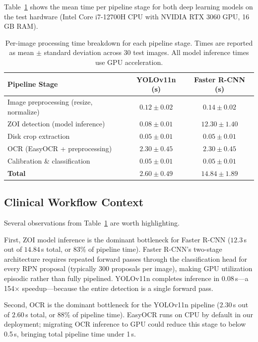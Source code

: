 Table~\ref{tab:processing_time} shows the mean time per pipeline stage
for both deep learning models on the test hardware
(Intel Core i7-12700H CPU with NVIDIA RTX 3060 GPU, 16\,GB RAM).

\begin{table}[H]
  \centering
  \caption{Per-image processing time breakdown for each pipeline stage.
           Times are reported as mean $\pm$ standard deviation across 30 test images.
           All model inference times use GPU acceleration.}
  \label{tab:processing_time}
  \begin{tabular}{lcc}
    \toprule
    \textbf{Pipeline Stage} &
    \textbf{YOLOv11n (s)} &
    \textbf{Faster R-CNN (s)} \\
    \midrule
    Image preprocessing (resize, normalize) & $0.12 \pm 0.02$ & $0.14 \pm 0.02$ \\
    ZOI detection (model inference)          & $0.08 \pm 0.01$ & $12.30 \pm 1.40$ \\
    Disk crop extraction                     & $0.05 \pm 0.01$ & $0.05 \pm 0.01$ \\
    OCR (EasyOCR + preprocessing)           & $2.30 \pm 0.45$ & $2.30 \pm 0.45$ \\
    Calibration \& classification            & $0.05 \pm 0.01$ & $0.05 \pm 0.01$ \\
    \midrule
    \textbf{Total}                           & $\mathbf{2.60 \pm 0.49}$ & $\mathbf{14.84 \pm 1.89}$ \\
    \bottomrule
  \end{tabular}
\end{table}

\subsection{Clinical Workflow Context}

Several observations from Table~\ref{tab:processing_time} are worth highlighting.

First, ZOI model inference is the dominant bottleneck for Faster R-CNN
($12.3$\,s out of $14.84$\,s total, or 83\% of pipeline time).
Faster R-CNN's two-stage architecture requires repeated forward passes through the
classification head for every RPN proposal (typically 300 proposals per image),
making GPU utilization episodic rather than fully pipelined.
YOLOv11n completes inference in $0.08$\,s---a 154$\times$ speedup---because
the entire detection is a single forward pass.

Second, OCR is the dominant bottleneck for the YOLOv11n pipeline
($2.30$\,s out of $2.60$\,s total, or 88\% of pipeline time).
EasyOCR runs on CPU by default in our deployment;
migrating OCR inference to GPU could reduce this stage to below 0.5\,s,
bringing total pipeline time under 1\,s.

